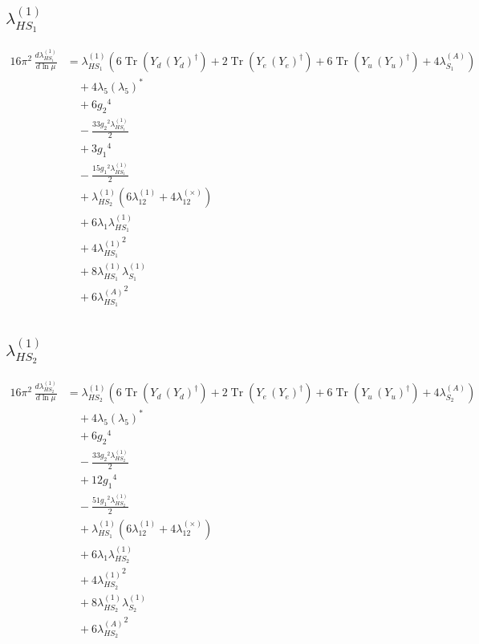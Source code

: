 \documentclass[10pt,a4paper]{article}
\begin{document}
\subsection*{$\lambda_{HS_1}^{(1)}$}
\begin{align*}
16\pi^2\,\frac{d \lambda_{HS_1}^{(1)}}{d\ln\mu} &={\lambda_{HS_1}^{(1)}} (6 \operatorname{Tr}\!\left({Y_d}\,\left({Y_d}\right)^{\dagger}\right)+2 \operatorname{Tr}\!\left({Y_e}\,\left({Y_e}\right)^{\dagger}\right)+6 \operatorname{Tr}\!\left({Y_u}\,\left({Y_u}\right)^{\dagger}\right)+4 {\lambda_{S_1}^{(A)}}) \\
&\quad +4 {\lambda_5} \left({\lambda_5}\right)^{*} \\
&\quad +6 {g_2}^4 \\
&\quad -\frac{33 {g_2}^2 {\lambda_{HS_1}^{(1)}}}{2} \\
&\quad +3 {g_1}^4 \\
&\quad -\frac{15 {g_1}^2 {\lambda_{HS_1}^{(1)}}}{2} \\
&\quad +{\lambda_{HS_2}^{(1)}} (6 {\lambda_{12}^{(1)}}+4 {\lambda_{12}^{(\times)}}) \\
&\quad +6 {\lambda_1} {\lambda_{HS_1}^{(1)}} \\
&\quad +4 {\lambda_{HS_1}^{(1)}}^2 \\
&\quad +8 {\lambda_{HS_1}^{(1)}} {\lambda_{S_1}^{(1)}} \\
&\quad +6 {\lambda_{HS_1}^{(A)}}^2 \\
\end{align*}
\subsection*{$\lambda_{HS_2}^{(1)}$}
\begin{align*}
16\pi^2\,\frac{d \lambda_{HS_2}^{(1)}}{d\ln\mu} &={\lambda_{HS_2}^{(1)}} (6 \operatorname{Tr}\!\left({Y_d}\,\left({Y_d}\right)^{\dagger}\right)+2 \operatorname{Tr}\!\left({Y_e}\,\left({Y_e}\right)^{\dagger}\right)+6 \operatorname{Tr}\!\left({Y_u}\,\left({Y_u}\right)^{\dagger}\right)+4 {\lambda_{S_2}^{(A)}}) \\
&\quad +4 {\lambda_5} \left({\lambda_5}\right)^{*} \\
&\quad +6 {g_2}^4 \\
&\quad -\frac{33 {g_2}^2 {\lambda_{HS_2}^{(1)}}}{2} \\
&\quad +12 {g_1}^4 \\
&\quad -\frac{51 {g_1}^2 {\lambda_{HS_2}^{(1)}}}{2} \\
&\quad +{\lambda_{HS_1}^{(1)}} (6 {\lambda_{12}^{(1)}}+4 {\lambda_{12}^{(\times)}}) \\
&\quad +6 {\lambda_1} {\lambda_{HS_2}^{(1)}} \\
&\quad +4 {\lambda_{HS_2}^{(1)}}^2 \\
&\quad +8 {\lambda_{HS_2}^{(1)}} {\lambda_{S_2}^{(1)}} \\
&\quad +6 {\lambda_{HS_2}^{(A)}}^2 \\
\end{align*}
\end{document}

